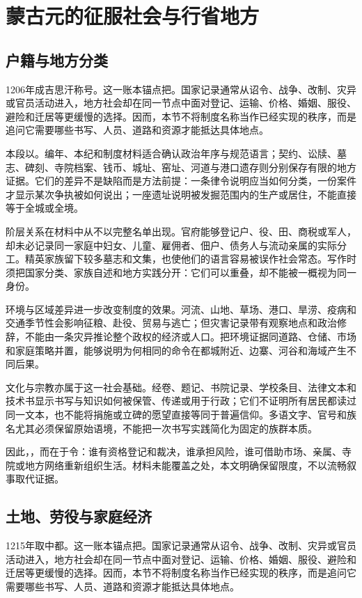 \section{蒙古元的征服社会与行省地方}

\subsection{户籍与地方分类}

1206年成吉思汗称号。这一账本锚点把。国家记录通常从诏令、战争、改制、灾异或官员活动进入，地方社会却在同一节点中面对登记、运输、价格、婚姻、服役、避险和迁居等更缓慢的选择。因而，本节不将制度名称当作已经实现的秩序，而是追问它需要哪些书写、人员、道路和资源才能抵达具体地点。

本段以。编年、本纪和制度材料适合确认政治年序与规范语言；契约、讼牍、墓志、碑刻、寺院档案、钱币、城址、窑址、河道与港口遗存则分别保存有限的地方证据。它们的差异不是缺陷而是方法前提：一条律令说明应当如何分类，一份案件才显示某次争执被如何说出；一座遗址说明被发掘范围内的生产或居住，不能直接等于全城或全境。

阶层关系在材料中从不以完整名单出现。官府能够登记户、役、田、商税或军人，却未必记录同一家庭中妇女、儿童、雇佣者、佃户、债务人与流动亲属的实际分工。精英家族留下较多墓志和文集，也使他们的语言容易被误作社会常态。写作时须把国家分类、家族自述和地方实践分开：它们可以重叠，却不能被一概视为同一身份。

环境与区域差异进一步改变制度的效果。河流、山地、草场、港口、旱涝、疫病和交通季节性会影响征粮、赴役、贸易与逃亡；但灾害记录带有观察地点和政治修辞，不能由一条灾异推论整个政权的经济或人口。把环境证据同道路、仓储、市场和家庭策略并置，能够说明为何相同的命令在都城附近、边寨、河谷和海域产生不同后果。

文化与宗教亦属于这一社会基础。经卷、题记、书院记录、学校条目、法律文本和技术书显示书写与知识如何被保管、传递或用于行政；它们不证明所有居民都读过同一文本，也不能将捐施或立碑的愿望直接等同于普遍信仰。多语文字、官号和族名尤其必须保留原始语境，不能把一次书写实践简化为固定的族群本质。

因此，，而在于令：谁有资格登记和裁决，谁承担风险，谁可借助市场、亲属、寺院或地方网络重新组织生活。材料未能覆盖之处，本文明确保留限度，不以流畅叙事取代证据。

\subsection{土地、劳役与家庭经济}

1215年取中都。这一账本锚点把。国家记录通常从诏令、战争、改制、灾异或官员活动进入，地方社会却在同一节点中面对登记、运输、价格、婚姻、服役、避险和迁居等更缓慢的选择。因而，本节不将制度名称当作已经实现的秩序，而是追问它需要哪些书写、人员、道路和资源才能抵达具体地点。

